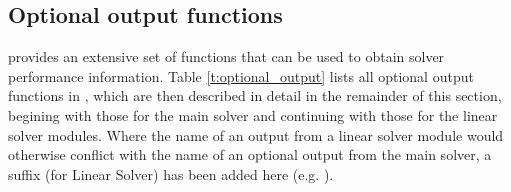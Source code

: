 \subsection{Optional output functions}\label{ss:optional_output}

{\cvodes} provides an extensive set of functions that can be used to obtain
solver performance information.
Table \ref{t:optional_output} lists all optional output functions in {\cvodes},
which are then described in detail in the remainder of this section, begining with those
for the main {\cvode} solver and continuing with those for the linear solver
modules. Where the name of an output from a linear solver module would otherwise conflict 
with the name of an optional output from the main solver, a suffix  (for Linear Solver) 
has been added here (e.g. ).

\newlength{\colABC}
\settowidth{\colABC}{No. of r.h.s. calls for finite diff. Jacobian-vector evals.}
\newlength{\colDEF}

\label{t:optional_output}
\tablelasttail{\hline}


